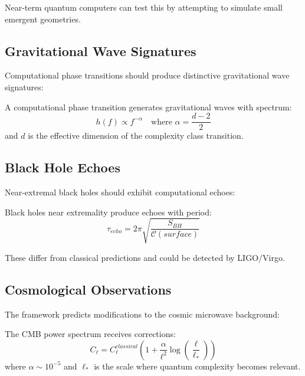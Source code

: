 \documentclass[12pt,a4paper]{article}
\newcommand{\comp}[1]{\mathcal{C}(#1)}
\begin{document}
Near-term quantum computers can test this by attempting to simulate small emergent geometries.

\subsection{Gravitational Wave Signatures}

Computational phase transitions should produce distinctive gravitational wave signatures:

\begin{theorem}
A computational phase transition generates gravitational waves with spectrum:
\begin{equation}
h(f) \propto f^{-\alpha} \quad \text{where } \alpha = \frac{d-2}{2}
\end{equation}
and $d$ is the effective dimension of the complexity class transition.
\end{theorem}

\subsection{Black Hole Echoes}

Near-extremal black holes should exhibit computational echoes:

\begin{proposition}
Black holes near extremality produce echoes with period:
\begin{equation}
\tau_{echo} = 2\pi \sqrt{\frac{S_{BH}}{\comp{surface}}}
\end{equation}
\end{proposition}

These differ from classical predictions and could be detected by LIGO/Virgo.

\subsection{Cosmological Observations}

The framework predicts modifications to the cosmic microwave background:

\begin{theorem}
The CMB power spectrum receives corrections:
\begin{equation}
C_\ell = C_\ell^{classical} \left(1 + \frac{\alpha}{\ell^2}\log\left(\frac{\ell}{\ell_*}\right)\right)
\end{equation}
where $\alpha \sim 10^{-5}$ and $\ell_*$ is the scale where quantum complexity becomes relevant.
\end{theorem}
\end{document}
